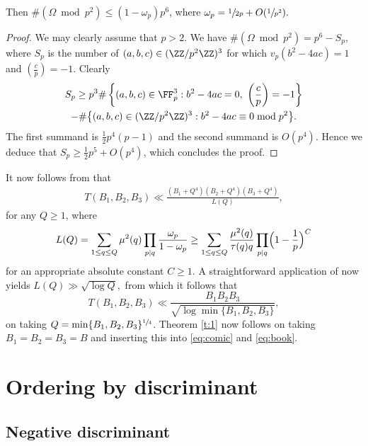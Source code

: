 \begin{lemma}
Then $\#(\Omega \bmod{p^2})\leq (1-\omega_p)p^6$, where
$\omega_p=\sfrac{1}{2p}+O(\sfrac{1}{p^2}).$
\end{lemma}

\begin{proof}
We may clearly assume that $p>2$. We have $\#(\Omega \bmod{p^2})=p^6-S_p$, where
$S_p$ is the number of $(a,b,c)\in (\ZZ/p^2\ZZ)^3$ for which $v_p(b^2-4ac)=1$ and
$(\frac{c}{p})= -1$.
Clearly
\begin{multline*}
S_p\geq
p^3\#\left\{ (a,b,c)\in \FF_p^3: b^2-4ac=0, ~\left(\frac{c}{p}\right)= -1\right\}\\
-\#\bigl\{
(a,b,c)\in (\ZZ/p^2\ZZ)^3: b^2-4ac\equiv 0\bmod{p^2}\bigr\}.
\end{multline*}
The first summand is $\frac{1}{2}p^4(p-1)$
and the second summand is $O(p^4)$.
Hence we deduce that
$S_p\geq \frac{1}{2}p^5+O(p^4)$, which concludes the proof.
\end{proof}

It now follows from
\cite[Lem.\,6.3]{large} that
\begin{align*}
T(B_1,B_2,B_3)
\ll \frac{(B_1+Q^4)(B_2+Q^4)(B_3+Q^4)}{L(Q)},
\end{align*}
for any $Q\geq 1$,
where
\[
L(Q)=\sum_{1\leq q\leq Q}\mu^2(q)\prod_{p\mid q} \frac{\omega_p}{1-\omega_p}\geq
\sum_{1\leq q\leq Q}\frac{\mu^2(q)}{\tau(q)q}\prod_{p\mid q} \Bigl(1-\frac{1}{p}\Bigr)^C
\]
for an appropriate absolute constant $C\geq 1$.
A straightforward application of
\hbox{\cite[Th.\,A.5]{FrIwOdC}} now yields
$
L(Q)\gg \sqrt{\log Q},
$
from which it follows that
\begin{equation}\label{eq:Tve}
T(B_1,B_2,B_3)\ll \frac{B_1B_2B_3}{\sqrt{\log \min \{B_1,B_2,B_3\}}},
\end{equation}
on taking $Q=\min \{B_1,B_2,B_3\}^{\sfrac{1}{4}}$.
Theorem \ref{t:1} now follows on
taking $B_1=B_2=B_3=B$ and
inserting this into \eqref{eq:comic} and \eqref{eq:book}.

\section{Ordering by discriminant}

\subsection{Negative discriminant}\label{sec:disc1}

